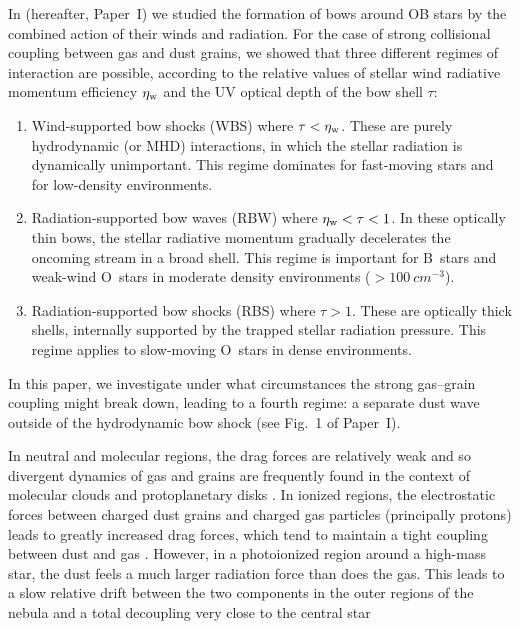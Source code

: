 \documentclass[useAMS, usenatbib, a4paper]{mnras}
\begin{document}
In \citet{Henney:2019a} (hereafter, Paper~I) we studied the formation
of bows around OB stars by the combined action of their winds and
radiation.  For the case of strong collisional coupling between gas
and dust grains, we showed that three different regimes of interaction
are possible, according to the relative values of stellar wind
radiative momentum efficiency \(\eta_{\text{w}}\) and the UV optical depth of
the bow shell \(\tau\):
\begin{enumerate}[{\(\star\)}]
\item Wind-supported bow shocks (WBS) where \(\tau < \eta_{\text{w}}\).  These are
  purely hydrodynamic (or MHD) interactions, in which the stellar
  radiation is dynamically unimportant.  This regime dominates for
  fast-moving stars and for low-density environments.
\item Radiation-supported bow waves (RBW) where
  \(\eta_{\text{w}} < \tau < 1\).  In these optically thin bows, the stellar
  radiative momentum gradually decelerates the oncoming stream in a
  broad shell.  This regime is important for B~stars and weak-wind
  O~stars in moderate density environments (\(> \SI{100}{cm^{-3}}\)).
\item Radiation-supported bow shocks (RBS) where \(\tau > 1\).  These are
  optically thick shells, internally supported by the trapped stellar
  radiation pressure.  This regime applies to slow-moving O~stars in
  dense environments.
\end{enumerate}
In this paper, we investigate under what circumstances the strong
gas--grain coupling might break down, leading to a fourth regime: a
separate dust wave outside of the hydrodynamic bow shock (see Fig.~1
of Paper~I).

In neutral and molecular regions, the drag forces are relatively weak
and so divergent dynamics of gas and grains are frequently found in
the context of molecular clouds \citetext{\citealp{Hopkins:2016a,
    Lee:2017a, Mattsson:2019a}, but see \citealp{Tricco:2017a}} and
protoplanetary disks \citep{Weidenschilling:1977b, Birnstiel:2010a,
  Dipierro:2018a}.  In ionized regions, the electrostatic forces
between charged dust grains and charged gas particles (principally
protons) leads to greatly increased drag forces, which tend to
maintain a tight coupling between dust and gas \citep{Draine:2011a}.
However, in a photoionized \hii{} region around a high-mass star, the
dust feels a much larger radiation force than does the gas. This leads
to a slow relative drift between the two components in the outer
regions of the nebula \citep{Gail:1979a, Akimkin:2015a, Akimkin:2017a,
  Ishiki:2018a} and a total decoupling very close to the central star
\citep[Fig.~8 of][]{Draine:2011a}
\end{document}
